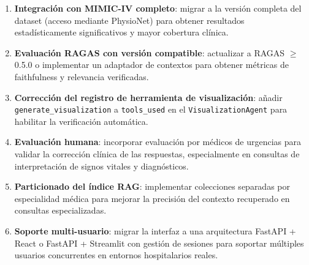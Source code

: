 \begin{enumerate}[nosep, leftmargin=*]
  \item \textbf{Integración con MIMIC-IV completo}: migrar a la versión
    completa del dataset (acceso mediante PhysioNet) para obtener resultados
    estadísticamente significativos y mayor cobertura clínica.
  \item \textbf{Evaluación RAGAS con versión compatible}: actualizar a
    RAGAS $\geq$\,0.5.0 o implementar un adaptador de contextos para
    obtener métricas de faithfulness y relevancia verificadas.
  \item \textbf{Corrección del registro de herramienta de visualización}:
    añadir \texttt{generate\_visualization} a \texttt{tools\_used} en el
    \texttt{VisualizationAgent} para habilitar la verificación automática.
  \item \textbf{Evaluación humana}: incorporar evaluación por médicos de
    urgencias para validar la corrección clínica de las respuestas, especialmente
    en consultas de interpretación de signos vitales y diagnósticos.
  \item \textbf{Particionado del índice RAG}: implementar colecciones
    separadas por especialidad médica para mejorar la precisión del contexto
    recuperado en consultas especializadas.
  \item \textbf{Soporte multi-usuario}: migrar la interfaz a una arquitectura
    FastAPI + React o FastAPI + Streamlit con gestión de sesiones para
    soportar múltiples usuarios concurrentes en entornos hospitalarios reales.
\end{enumerate}





%

